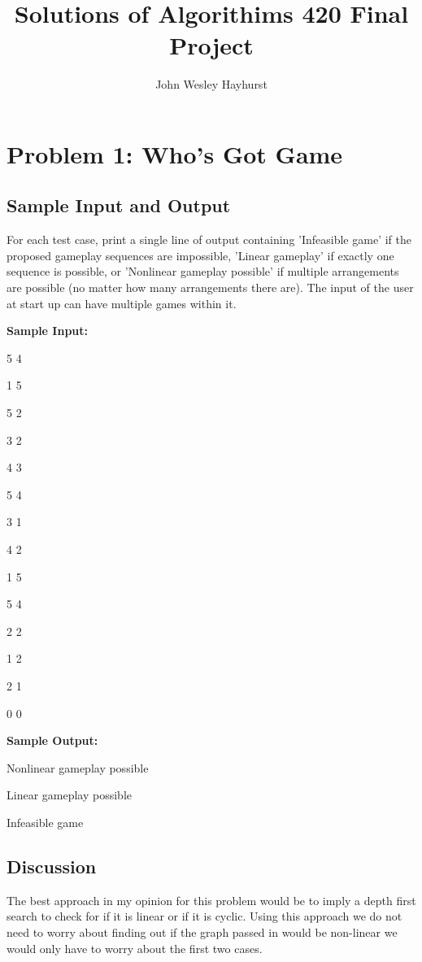 \documentclass[11pt]{article}
\begin{document}
  \title{Solutions of Algorithims 420 Final Project}
  \author{John Wesley Hayhurst}
  \maketitle
\section{Problem 1: Who's Got Game}

\subsection{Sample Input and Output}
For each test case, print a single line of output containing 'Infeasible game' if the proposed gameplay sequences are impossible, 'Linear gameplay' if exactly one sequence is possible, or 'Nonlinear gameplay possible' if multiple arrangements are possible (no matter how many arrangements there are).
The input of the user at start up can have multiple games within it.
\begin{flushleft}

\textbf{Sample Input:}
\vspace{2mm}
\par
5 4
  
1 5
  
5 2
  
3 2
  
4 3
  
5 4
  
3 1
  
4 2
  
1 5 
  
5 4
  
2 2
  
1 2
  
2 1
  
0 0
\vspace{2mm}
\par
\textbf{Sample Output:}
\vspace{2mm}
\par
Nonlinear gameplay possible

Linear gameplay possible

Infeasible game 
\end{flushleft}
\subsection{Discussion}
The best approach in my opinion for this problem would be to imply a depth first search to check for if it is linear or if it is cyclic. Using this approach we do not need to worry about finding out if the graph passed in would be non-linear we would only have to worry about the first two cases. 
\end{document}
